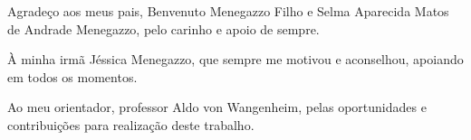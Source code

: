 \begin{agradecimentos}
  
  Agradeço aos meus pais, Benvenuto Menegazzo Filho e Selma Aparecida Matos de Andrade Menegazzo, pelo carinho e apoio de sempre.
  
  À minha irmã Jéssica Menegazzo, que sempre me motivou e aconselhou, apoiando em todos os momentos. 
  
  Ao meu orientador, professor Aldo von Wangenheim, pelas oportunidades e contribuições para realização deste trabalho.

\end{agradecimentos}